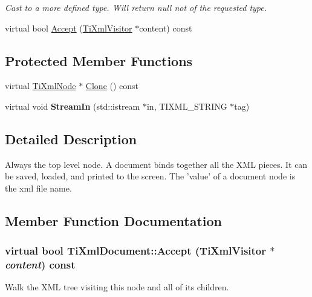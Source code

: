 \begin{DoxyCompactItemize}
\begin{DoxyCompactList}\small\item\em Cast to a more defined type. Will return null not of the requested type. \item\end{DoxyCompactList}\item 
virtual bool \hyperlink{class_ti_xml_document_aa545aae325d9752ad64120bc4ecf939a}{Accept} (\hyperlink{class_ti_xml_visitor}{TiXmlVisitor} $\ast$content) const 
\end{DoxyCompactItemize}
\subsection*{Protected Member Functions}
\begin{DoxyCompactItemize}
\item 
virtual \hyperlink{class_ti_xml_node}{TiXmlNode} $\ast$ \hyperlink{class_ti_xml_document_a4968661cab4a1f44a23329c6f8db1907}{Clone} () const 
\item 
\hypertarget{class_ti_xml_document_ab6d70b2c19e46aedb9903b3c3aa2a568}{
virtual void {\bfseries StreamIn} (std::istream $\ast$in, TIXML\_\-STRING $\ast$tag)}
\label{class_ti_xml_document_ab6d70b2c19e46aedb9903b3c3aa2a568}

\end{DoxyCompactItemize}


\subsection{Detailed Description}
Always the top level node. A document binds together all the XML pieces. It can be saved, loaded, and printed to the screen. The 'value' of a document node is the xml file name. 

\subsection{Member Function Documentation}
\hypertarget{class_ti_xml_document_aa545aae325d9752ad64120bc4ecf939a}{
\subsubsection[{Accept}]{\setlength{\rightskip}{0pt plus 5cm}virtual bool TiXmlDocument::Accept ({\bf TiXmlVisitor} $\ast$ {\em content}) const}}
\label{class_ti_xml_document_aa545aae325d9752ad64120bc4ecf939a}
Walk the XML tree visiting this node and all of its children. 

